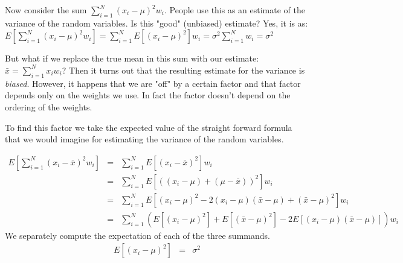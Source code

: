 \documentclass{article}
\begin{document}
Now consider the sum $\sum_{i=1}^N (x_i - \mu)^2 w_i$.
People use this as an estimate of the variance of the random variables. Is this "good" (unbiased) estimate?
Yes, it is as: $E\left[ \sum_{i=1}^N (x_i - \mu)^2 w_i \right] = \sum_{i=1}^N E[(x_i- \mu)^2] w_i = \sigma^2 \sum_{i=1}^N w_i = \sigma^2$

But what if we replace the true mean in this sum with our estimate: ${\bar x} = \sum_{i=1}^N x_i w_i$?
Then it turns out that the resulting estimate for the variance is {\em biased\/}.
However, it happens that we are "off" by a certain factor and that factor depends only on the weights 
we use. In fact the factor doesn't depend on the ordering of the weights.

To find this factor we take the expected value of the straight forward formula that we would imagine
for estimating the variance of the random variables.

\begin{eqnarray}
    E\left[ \sum_{i=1}^N (x_i - {\bar x})^2 w_i \right] & = & \sum_{i=1}^N E\left[(x_i - {\bar x})^2\right] w_i \nonumber \\
    & = & \sum_{i=1}^N E\left[\left((x_i - \mu) + (\mu - {\bar x})\right)^2\right] w_i \nonumber \\
    & = & \sum_{i=1}^N E\left[(x_i - \mu)^2 - 2(x_i - \mu)({\bar x} - \mu ) + ({\bar x} - \mu)^2\right] w_i \nonumber \\
    & = & \sum_{i=1}^N \left( E\left[(x_i - \mu)^2\right] + E\left[ ({\bar x} - \mu)^2\right] 
              - 2E\left[(x_i - \mu) ({\bar x} - \mu) \right] \right) w_i \label{standard_emp_var}
\end{eqnarray}
We separately compute the expectation of each of the three summands.
\begin{eqnarray}
    E\left[(x_i - \mu)^2\right] & = & \sigma^2
\end{eqnarray}
\end{document}
